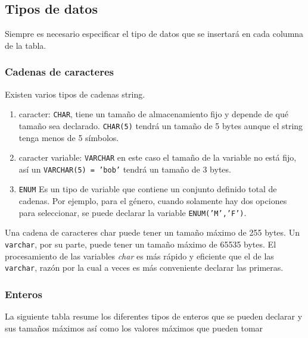 \subsection{Tipos de datos}
Siempre es necesario especificar el tipo de datos que se insertará en cada columna de la tabla.
\subsubsection{Cadenas de caracteres}

Existen varios tipos de cadenas string. 

\begin{enumerate}
    \item caracter: \texttt{CHAR}, tiene un tamaño de almacenamiento fijo y depende de qué tamaño sea declarado. \texttt{CHAR(5)} tendrá un tamaño de 5 bytes aunque el string tenga menos de 5 símbolos. 
    \item caracter variable: \texttt{VARCHAR} en este caso el tamaño de la variable no está fijo, así un \texttt{VARCHAR(5) = 'bob'} tendrá un tamaño de 3 bytes.
    \item \texttt{ENUM} Es un tipo de variable que contiene un conjunto definido total de cadenas. Por ejemplo, para el género, cuando solamente hay dos opciones para seleccionar, se puede declarar la variable \texttt{ENUM('M','F')}.
\end{enumerate}

Una cadena de caracteres char puede tener un tamaño máximo de 255 bytes. Un \texttt{varchar}, por su parte, puede tener un tamaño máximo de 65535 bytes. El procesamiento de las variables \textit{char} es más rápido y eficiente que el de las \texttt{varchar}, razón por la cual a veces es más conveniente declarar las primeras. \\ 

\subsubsection{Enteros}

La siguiente tabla resume los diferentes tipos de enteros que se pueden declarar y sus tamaños máximos así como los valores máximos que pueden tomar

